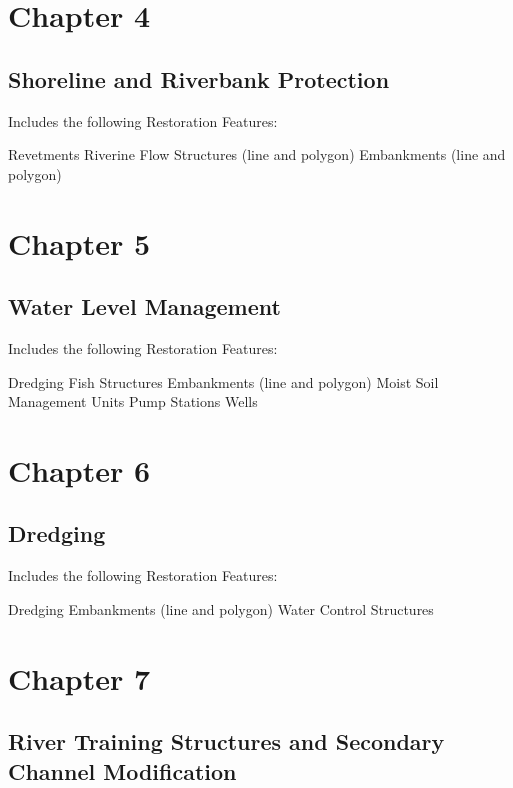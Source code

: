 \documentclass[
  letterpaper,
  DIV=11,
  numbers=noendperiod]{scrreprt}
\begin{document}
\section{Chapter 4}\label{chapter-4}

\subsection{Shoreline and Riverbank
Protection}\label{shoreline-and-riverbank-protection}

Includes the following Restoration Features:

Revetments Riverine Flow Structures (line and polygon) Embankments (line
and polygon)

\section{Chapter 5}\label{chapter-5}

\subsection{Water Level Management}\label{water-level-management-1}

Includes the following Restoration Features:

Dredging Fish Structures Embankments (line and polygon) Moist Soil
Management Units Pump Stations Wells

\section{Chapter 6}\label{chapter-6}

\subsection{Dredging}\label{dredging}

Includes the following Restoration Features:

Dredging Embankments (line and polygon) Water Control Structures

\section{Chapter 7}\label{chapter-7}

\subsection{River Training Structures and Secondary Channel
Modification}\label{river-training-structures-and-secondary-channel-modification}
\end{document}
